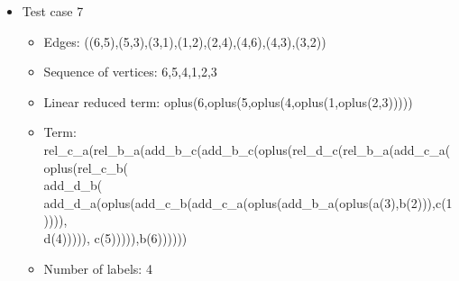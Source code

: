 \documentclass[a4paper, 12pt]{article}
\begin{document}
\begin{itemize}
\item Test case 7
	\begin{itemize}
		\item Edges: ((6,5),(5,3),(3,1),(1,2),(2,4),(4,6),(4,3),(3,2))		
		\item Sequence of vertices: 6,5,4,1,2,3
		\item Linear reduced term: oplus(6,oplus(5,oplus(4,oplus(1,oplus(2,3)))))
		\item Term: rel\_c\_a(rel\_b\_a(add\_b\_c(add\_b\_c(oplus(rel\_d\_c(rel\_b\_a(add\_c\_a(oplus(rel\_c\_b( \\
add\_d\_b( add\_d\_a(oplus(add\_c\_b(add\_c\_a(oplus(add\_b\_a(oplus(a(3),b(2))),c(1)))), \\
d(4))))), c(5))))),b(6))))))
		\item Number of labels: 4
	\end{itemize}
\end{itemize}
\end{document}
